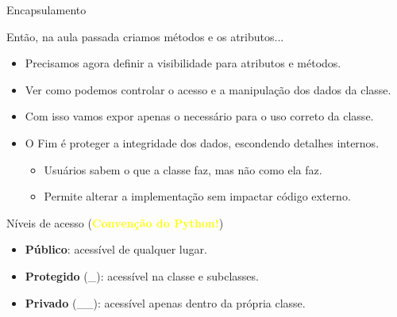 \begin{frame}{Encapsulamento}

    \begin{block}{Então, na aula passada criamos métodos e os atributos...}
        \begin{itemize}
            \item Precisamos agora definir a visibilidade para atributos e métodos.
            \item Ver como podemos controlar o acesso e a manipulação dos dados da classe.

            \item Com isso vamos expor apenas o necessário para o uso correto da classe.

            \item O Fim é proteger a integridade dos dados, escondendo detalhes internos.
                  \begin{itemize}
                      \item Usuários sabem o que a classe faz, mas não como ela faz.
                      \item Permite alterar a implementação sem impactar código externo.
                  \end{itemize}
        \end{itemize}
    \end{block}



    \begin{block}{Níveis de acesso (\textcolor{yellow}{\textbf{Convenção do Python!}})}
        \begin{itemize}
            \item \textbf{Público}: acessível de qualquer lugar.
            \item \textbf{Protegido} (\_): acessível na classe e subclasses.
            \item \textbf{Privado} (\_\_): acessível apenas dentro da própria classe.

        \end{itemize}
    \end{block}

\end{frame}

